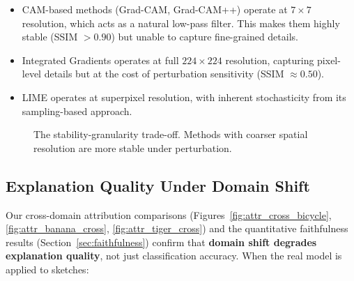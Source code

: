 \documentclass[12pt, a4paper]{article}
\begin{document}
\begin{itemize}[leftmargin=*]
    \item CAM-based methods (Grad-CAM, Grad-CAM++) operate at $7 \times 7$
          resolution, which acts as a natural low-pass filter.  This makes them
          highly stable (SSIM $> 0.90$) but unable to capture fine-grained
          details.
    \item Integrated Gradients operates at full $224 \times 224$ resolution,
          capturing pixel-level details but at the cost of perturbation
          sensitivity (SSIM $\approx 0.50$).
    \item LIME operates at superpixel resolution, with inherent stochasticity
          from its sampling-based approach.
\end{itemize}

\begin{figure}[H]
\centering
{}
\caption{The stability-granularity trade-off.  Methods with coarser spatial
resolution are more stable under perturbation.}
\label{fig:stability_tradeoff}
\end{figure}

\subsection{Explanation Quality Under Domain Shift}

Our cross-domain attribution comparisons (Figures~\ref{fig:attr_cross_bicycle},
\ref{fig:attr_banana_cross}, \ref{fig:attr_tiger_cross}) and the quantitative
faithfulness results (Section~\ref{sec:faithfulness}) confirm that
\textbf{domain shift degrades explanation quality}, not just classification
accuracy.  When the real model is applied to sketches:
\end{document}
